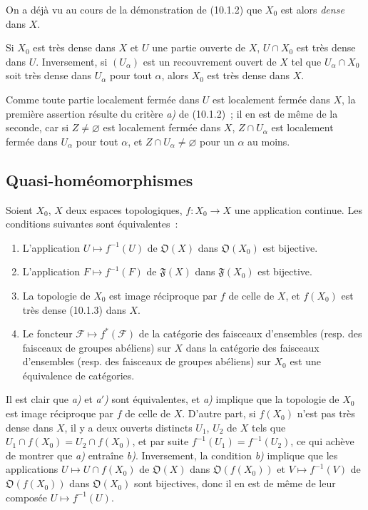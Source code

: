 On a déjà vu au cours de la démonstration de (10.1.2) que $X_0$ est alors
\emph{dense} dans $X$.

\begin{corollary}[10.1.4]
\label{IV.10.1.4-fr}
Si $X_0$ est très dense dans $X$ et $U$ une partie ouverte de $X$,
$U\cap X_0$ est très dense dans $U$. Inversement, si $(U_\alpha)$ est un
recouvrement ouvert de $X$ tel que $U_\alpha\cap X_0$ soit très dense dans
$U_\alpha$ pour tout $\alpha$, alors $X_0$ est très dense dans $X$.
\end{corollary}

Comme toute partie localement fermée dans $U$ est localement fermée dans $X$,
la première assertion résulte du critère \emph{a)} de (10.1.2)~; il en est de
même de la seconde, car si $Z\neq\varnothing$ est localement fermée dans $X$,
$Z\cap U_\alpha$ est localement fermée dans $U_\alpha$ pour tout $\alpha$,
et $Z\cap U_\alpha\neq\varnothing$ pour un $\alpha$ au moins.

\subsection{Quasi-homéomorphismes}
\label{subsection:IV.10.2-fr}

\begin{proposition}[10.2.1]
\label{IV.10.2.1-fr}
Soient $X_0$, $X$ deux espaces topologiques, $f:X_0\to X$ une application
continue. Les conditions suivantes sont équivalentes~:
\begin{enumerate}[label=\emph{\alph*)}]
  \item L'application $U\mapsto f^{-1}(U)$ de $\mathfrak O(X)$ dans
  $\mathfrak O(X_0)$ est bijective.
  \item[\emph{a$'$)}] L'application $F\mapsto f^{-1}(F)$ de $\mathfrak F(X)$
  dans $\mathfrak F(X_0)$ est bijective.
  \item La topologie de $X_0$ est image réciproque par $f$ de celle de $X$, et
  $f(X_0)$ est très dense (10.1.3) dans $X$.
  \item Le foncteur $\mathcal F\mapsto f^*(\mathcal F)$ de la catégorie des
  faisceaux d'ensembles (resp. des faisceaux de groupes abéliens) sur $X$ dans
  la catégorie des faisceaux d'ensembles (resp. des faisceaux de groupes
  abéliens) sur $X_0$ est une équivalence de catégories.
\end{enumerate}
\end{proposition}

Il est clair que \emph{a)} et \emph{a$'$)} sont équivalentes, et \emph{a)}
implique que la topologie de $X_0$ est image réciproque par $f$ de celle de
$X$. D'autre part, si $f(X_0)$ n'est pas très dense dans $X$, il y a deux
ouverts distincts $U_1$, $U_2$ de $X$ tels que
$U_1\cap f(X_0)=U_2\cap f(X_0)$, et par suite
$f^{-1}(U_1)=f^{-1}(U_2)$, ce qui achève de montrer que \emph{a)} entraîne
\emph{b)}. Inversement, la condition \emph{b)} implique que les applications
$U\mapsto U\cap f(X_0)$ de $\mathfrak O(X)$ dans $\mathfrak O(f(X_0))$ et
$V\mapsto f^{-1}(V)$ de $\mathfrak O(f(X_0))$ dans $\mathfrak O(X_0)$ sont
bijectives, donc il en est de même de leur composée $U\mapsto f^{-1}(U)$.

